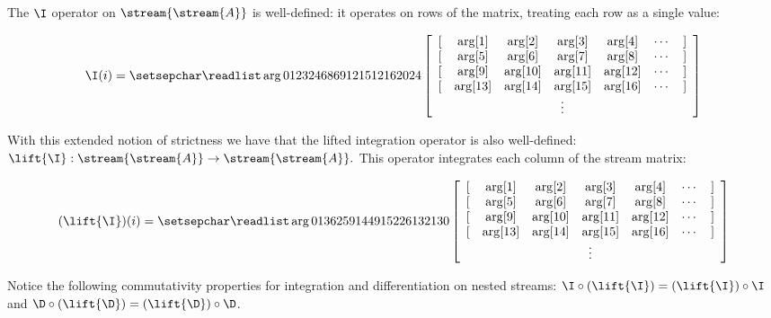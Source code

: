 The $\I$ operator on $\stream{\stream{A}}$ is well-defined: it operates on rows
of the matrix, treating each row as a single value:

$$\I(i) = \ssa{0 1 2 3 2 4 6 8 6 9 12 15 12 16 20 24}$$

With this extended notion of strictness we have that the lifted integration operator
is also well-defined: $\lift{\I}: \stream{\stream{A}} \to \stream{\stream{A}}.$
This operator integrates each column of the stream matrix:

$$(\lift{\I})(i) = \ssa{0 1 3 6 2 5 9 14 4 9 15 22 6 13 21 30}$$

Notice the following commutativity properties for integration and differentiation
on nested streams: $\I \circ (\lift{\I}) = (\lift{\I}) \circ \I$ and
$\D \circ (\lift{\D}) = (\lift{\D}) \circ \D$.

